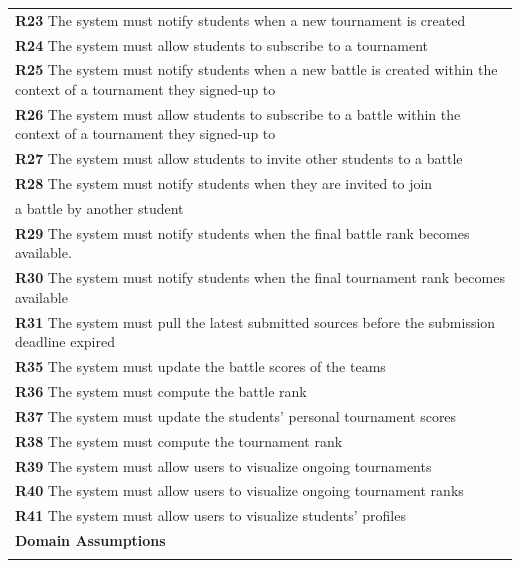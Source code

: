 \begin{table}[H]
\begin{tabularx}{\textwidth}{X}
        \textbf{R23} The system must notify students when a new tournament is created            \\ 
        \textbf{R24} The system must allow students to subscribe to a tournament     \\ 
        \textbf{R25} The system must notify students when a new battle is created within the context of a tournament they signed-up to        \\ 
        \textbf{R26} The system must allow students to subscribe to a battle  within the context of a tournament they signed-up to            \\
        \textbf{R27} The system must allow students to invite other students to a battle     \\ 
        \textbf{R28} The system must notify students when they are invited to join \\ a battle by another student        \\ 
        \textbf{R29} The system must notify students when the final battle rank becomes available.       \\ 
        \textbf{R30} The system must notify students when the final tournament rank becomes available     \\ 
        \textbf{R31} The system must pull the latest submitted sources before the submission deadline expired     \\ 
        \textbf{R35} The system must update the battle scores of the teams       \\ 
        \textbf{R36} The system must compute the battle rank     \\  
        \textbf{R37} The system must update the students' personal tournament scores         \\ 
        \textbf{R38} The system must compute the tournament rank         \\
        \textbf{R39} The system must allow users to visualize ongoing tournaments    \\
        \textbf{R40} The system must allow users to visualize ongoing tournament ranks       \\
        \textbf{R41} The system must allow users to visualize students' profiles     \\
        \midrule
        \textbf{Domain Assumptions}                                                                                                  \\ \midrule
                                                       \\ \bottomrule
    \end{tabularx}
\end{table}

